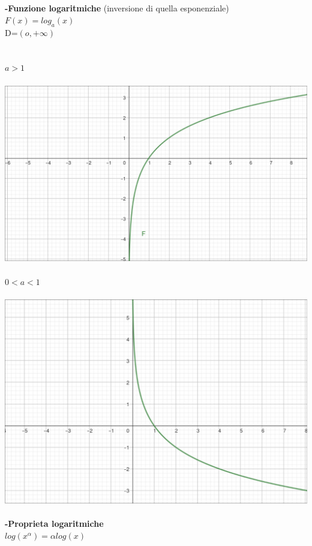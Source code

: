 \documentclass{article}
\begin{document}
\\
\\
\textbf{-Funzione logaritmiche} (inversione di quella esponenziale)\\
$F(x)=log_{a}(x)$\\
D=$(o,+\infty)$\\
\\
\\
$a>1$\\
\\
\includegraphics{./immagini/funzione-logaritmica.png}
\\
\\
$0<a<1$\\
\\
\includegraphics{./immagini/funzione-logartmica-negativa.png}
\\
\\
\textbf{-Proprieta logaritmiche}\\
$log(x^{\alpha})=\alpha log(x)$\\
\end{document}
